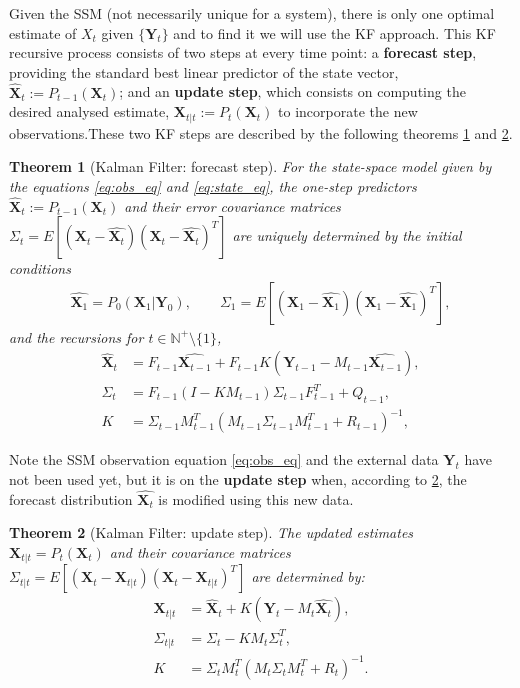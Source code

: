 \documentclass{article}
\newtheorem{theorem}{Theorem}[section]
\theoremstyle{definition}
\theoremstyle{definition}
\theoremstyle{remark}
\theoremstyle{mythmstyle}
\begin{document}
Given the SSM (not necessarily unique for a system), there is only one optimal estimate of $X_t$ given $\{\textbf{Y}_t\}$ and to find it we will use the KF approach. This KF recursive process consists of two steps at every time point: a \textbf{forecast step}, providing the standard best linear predictor of the state vector, $\hat{\textbf{X}}_t:=P_{t-1}(\bm{X}_t)$; and an \textbf{update step}, which consists on computing the desired analysed estimate, $\textbf{X}_{t|t}:=P_{t}(\bm{X}_t)$ to incorporate the new observations.These two KF steps are described by the following theorems \ref{teor:forecast} and \ref{teor:update}. 
\begin{theorem}[Kalman Filter: forecast step]\label{teor:forecast}
For the state-space model given by the equations \eqref{eq:obs_eq} and \eqref{eq:state_eq}, the one-step predictors $\hat{\textbf{X}}_t:=P_{t-1}(\textbf{X}_t)$ and their error covariance matrices $\Sigma_t = E\left[ (\textbf{X}_t - \hat{\textbf{X}_t})(\textbf{X}_t - \hat{\textbf{X}_t})^T \right]$ are uniquely determined by the initial conditions
\begin{align*}
    \hat{\textbf{X}_1} = P_0(\textbf{X}_1|\textbf{Y}_0), \quad \quad \Sigma_1 = E\left[ (\textbf{X}_1 - \hat{\textbf{X}_1})(\textbf{X}_1 - \hat{\textbf{X}_1})^T \right],
\end{align*}
and the recursions for $t\in \mathbb{N}^{+} \setminus \{1\}$, 
\begin{align}
    \widehat{\textbf{X}}_{t} &= F_{t-1} \widehat{\textbf{X}_{t-1}} + F_{t-1} K(\textbf{Y}_{t-1} - M_{t-1} \widehat{\textbf{X}_{t-1}}),\\
    \Sigma_{t} &= F_{t-1} (I-K M_{t-1})  \Sigma_{t-1}F_{t-1}^T+ Q_{t-1}, \label{KP2} \\
    K&= \Sigma_{t-1} M_{t-1}^T(M_{t-1}\Sigma_{t-1} M_{t-1}^T+ R_{t-1})^{-1},
\end{align}
\end{theorem}

Note the SSM observation equation \ref{eq:obs_eq} and the external data $\textbf{Y}_t$ have not been used yet, but it is on the \textbf{update step} when, according to \ref{teor:update}, the forecast distribution $\widehat{\textbf{X}_t}$ is modified using this new data.

\begin{theorem}[Kalman Filter: update step]\label{teor:update}
The updated estimates $\textbf{X}_{t|t} = P_t(\textbf{X}_t)$ and their covariance matrices $\Sigma_{t|t}= E\left[ (\textbf{X}_t - \textbf{X}_{t|t})(\textbf{X}_t - \textbf{X}_{t|t})^T \right] $ are determined by:
\begin{align}
    \textbf{X}_{t|t}&=\hat{\textbf{X}}_t + K (\textbf{Y}_t - M_t \hat{\textbf{X}_t}), \label{KFteo1}\\
   \Sigma_{t|t}&= \Sigma_t - K M_t \Sigma_t^T,  \label{KFteo2}\\
   K&= \Sigma_t M_t^T(M_t\Sigma_t M_t^T+ R_t)^{-1}.
\end{align}
\end{theorem}
\end{document}
